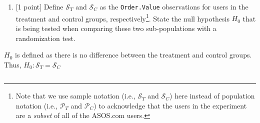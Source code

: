 \documentclass[
]{article}
\providecommand{\tightlist}{%
  \setlength{\itemsep}{0pt}\setlength{\parskip}{0pt}}
\begin{document}
\begin{enumerate}
\def\labelenumi{(\alph{enumi})}
\setcounter{enumi}{3}
\tightlist
\item
  {[}1 point{]} Define \(\mathcal{S}_{T}\) and \(\mathcal{S}_{C}\) as
  the \texttt{Order.Value} observations for users in the treatment and
  control groups, respectively\footnote{Note that we use sample notation
    (i.e., \(\mathcal{S}_{T}\) and \(\mathcal{S}_{C}\)) here instead of
    population notation (i.e., \(\mathcal{P}_{T}\) and
    \(\mathcal{P}_{C}\)) to acknowledge that the users in the experiment
    are a \emph{subset} of all of the ASOS.com users.}. State the null
  hypothesis \(H_0\) that is being tested when comparing these two
  sub-populations with a randomization test.
\end{enumerate}

\(H_0\) is defined as there is no difference between the treatment and
control groups. Thus, \(H_0: \mathcal{S}_{T} =\mathcal{S}_{C}\)

\(\;\)
\end{document}
